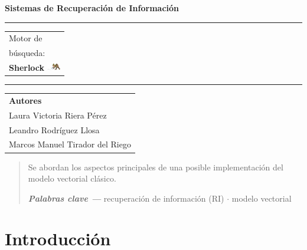 \documentclass{llncs}
\providecommand{\keywords}[1]
{
	\small	
	\textbf{\textit{Palabras clave --- }} #1
}
\begin{document}
	\thispagestyle{empty}
	\begin{flushleft}
		\LARGE\bfseries Sistemas de Recuperaci\'on de Informaci\'on\\[2cm]
	\end{flushleft}
	\rule{\textwidth}{1pt}
	\vspace{2pt}
	\begin{flushright}
		\Huge
		\begin{tabular}{@{}l}
			Motor de \\
			b\'usqueda:\\
			\textbf{Sherlock}
			\includegraphics[height=1em]{sherlock.png}\\[6pt]
		\end{tabular}
	\end{flushright}
	\rule{\textwidth}{1pt}
	\vfill
	\begin{flushleft}
		\large\itshape
		\begin{tabular}{@{}l}
			{\large\upshape\bfseries Autores}\\[8pt]
			Laura Victoria Riera P\'erez\\[5pt]
			Leandro Rodr\'iguez Llosa\\[5pt]
			Marcos Manuel Tirador del Riego
		\end{tabular}
	\end{flushleft}
	
	\newpage
	\begin{abstract}
		Se abordan los aspectos principales de una posible implementaci\'on del modelo vectorial cl\'asico.
		
		\vspace{1em}
		\keywords{recuperaci\'on de informaci\'on (RI) \textbf{$\cdot$} modelo vectorial}
	\end{abstract} 
	\thispagestyle{empty}
	
	
	\newpage
	\tableofcontents
	\thispagestyle{empty}
	
	\newpage
	
	\section{Introducci\'on}
	
\end{document}
